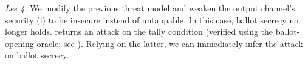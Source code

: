 \noindent
\textit{Lee 4.}
We modify the previous threat model and weaken the 
output channel's security (i) to be
insecure instead of untappable. In this case, ballot secrecy no longer holds.
\proverif returns an attack on the tally condition (verified using the ballot-opening oracle;
see ). Relying on the latter,
we can immediately infer the attack on ballot secrecy.
%
%



